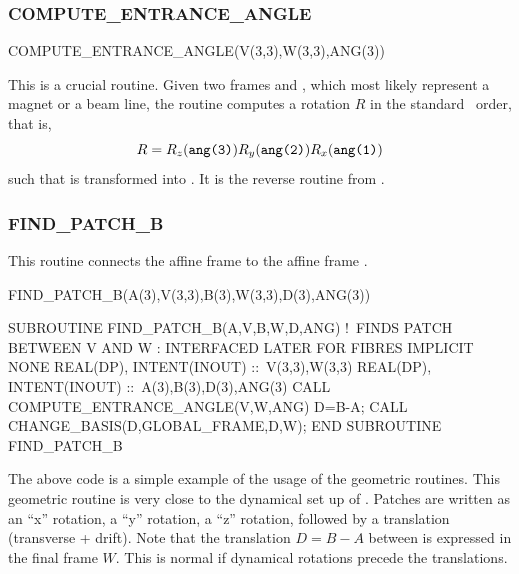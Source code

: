 \subsubsection{COMPUTE_ENTRANCE_ANGLE}

%
\begin{ptccode}
COMPUTE_ENTRANCE_ANGLE(V(3,3),W(3,3),ANG(3))
\end{ptccode}

%
This is a crucial routine. Given two frames  and , which most likely
represent a magnet or a beam line, the routine computes a rotation
$R$ in the standard \PTC\ order, that is,
\begin{equation*}
  R = R_z (\texttt{ang(3)}) R_y (\texttt{ang(2)}) R_x (\texttt{ang(1)})
\end{equation*}
such that  is transformed into . It is the reverse routine from .


\subsubsection{FIND_PATCH_B}

%
This routine connects the affine frame  to the affine frame .

\begin{ptccode}
FIND_PATCH_B(A(3),V(3,3),B(3),W(3,3),D(3),ANG(3))
\end{ptccode}

\begin{ptccode}
SUBROUTINE FIND_PATCH_B(A,V,B,W,D,ANG)
  !\ FINDS PATCH BETWEEN V AND W : INTERFACED LATER FOR FIBRES
  IMPLICIT NONE
  REAL(DP), INTENT(INOUT) ::\ V(3,3),W(3,3)
  REAL(DP), INTENT(INOUT) ::\ A(3),B(3),D(3),ANG(3)
  CALL COMPUTE_ENTRANCE_ANGLE(V,W,ANG)
  D=B-A; CALL CHANGE_BASIS(D,GLOBAL_FRAME,D,W);
END SUBROUTINE FIND_PATCH_B
\end{ptccode}

The above code is a simple example of the usage of the geometric routines.
This geometric routine is very close to the dynamical set up of \PTC. Patches
are written as an ``x'' rotation, a ``y'' rotation, a ``z'' rotation, followed by a
translation (transverse + drift). Note that the translation $D = B - A$ between
is expressed in the final frame $W$. This is normal if dynamical rotations
precede the translations.


